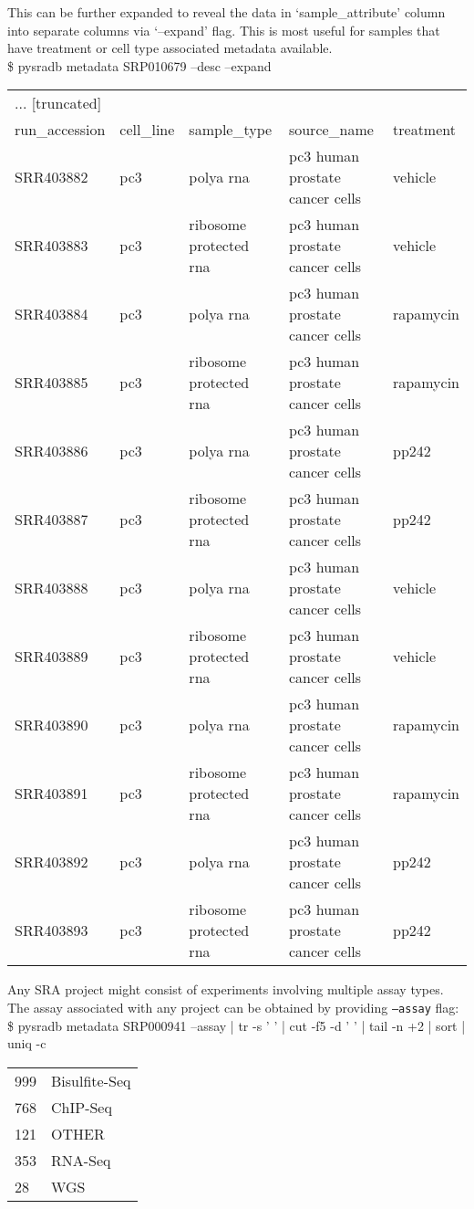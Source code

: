 \documentclass[9pt,a4paper]{extarticle}
\newenvironment{allintypewriter}{\ttfamily}{\par}
\begin{document}
This can be further expanded to reveal the data in `sample\_attribute' column into
separate columns via `--expand' flag. This is most useful for samples that have treatment or cell type associated
metadata available.\\

\begin{allintypewriter}
\$ pysradb metadata SRP010679 --desc --expand
\begin{table}[H]
    \begin{tabular}{lllll}
    ... [truncated]\\
run_accession & cell_line & sample_type &  source_name &  treatment\\
SRR403882 & pc3 & polya rna & pc3 human prostate cancer cells & vehicle\\
SRR403883 & pc3 & ribosome protected rna & pc3 human prostate cancer cells & vehicle\\
SRR403884 & pc3 & polya rna & pc3 human prostate cancer cells & rapamycin\\
SRR403885 & pc3 & ribosome protected rna & pc3 human prostate cancer cells & rapamycin\\
SRR403886 & pc3 & polya rna & pc3 human prostate cancer cells & pp242\\
SRR403887 & pc3 & ribosome protected rna & pc3 human prostate cancer cells & pp242\\
SRR403888 & pc3 & polya rna & pc3 human prostate cancer cells & vehicle\\
SRR403889 & pc3 & ribosome protected rna & pc3 human prostate cancer cells & vehicle\\
SRR403890 & pc3 & polya rna & pc3 human prostate cancer cells & rapamycin\\
SRR403891 & pc3 & ribosome protected rna & pc3 human prostate cancer cells & rapamycin\\
SRR403892 & pc3 & polya rna & pc3 human prostate cancer cells & pp242\\
SRR403893 & pc3 & ribosome protected rna & pc3 human prostate cancer cells & pp242
 \end{tabular}
\end{table}
\end{allintypewriter}

Any SRA project might consist of experiments involving multiple assay types.
The assay associated with any project can be obtained by providing
\texttt{--assay} flag:\\

\begin{allintypewriter}
\$ pysradb metadata SRP000941 --assay  | tr -s '  ' | cut -f5 -d ' ' | tail -n +2 | sort | uniq -c
\begin{table}[H]
    \begin{tabular}{ll}
        999  & Bisulfite-Seq\\
        768 & ChIP-Seq\\
        121 & OTHER\\
        353 & RNA-Seq\\
        28 & WGS
    \end{tabular}
\end{table}
\end{allintypewriter}
~\\
\end{document}
